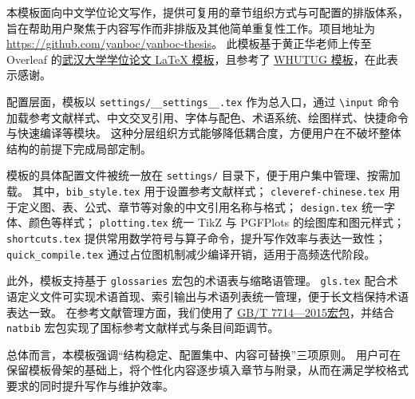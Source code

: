 
%

\begin{cnabstract}

本模板面向中文学位论文写作，提供可复用的章节组织方式与可配置的排版体系，旨在帮助用户聚焦于内容写作而非排版及其他简单重复性工作。项目地址为 \url{https://github.com/yanboc/yanboc-thesis}。
此模板基于黄正华老师上传至 Overleaf 的\href{https://www.overleaf.com/latex/templates/wu-yi-da-xue-bo-shi-lun-wen-latex-mo-ban/rcdzgvqgkddk}{武汉大学学位论文 LaTeX 模板}，且参考了 \href{https://github.com/whutug/whu-thesis}{WHUTUG 模板}，在此表示感谢。

配置层面，模板以 \texttt{settings/\_\_settings\_\_.tex}
作为总入口，通过 \texttt{\textbackslash input} 命令加载参考文献样式、中文交叉引用、字体与配色、术语系统、绘图样式、快捷命令与快速编译等模块。
这种分层组织方式能够降低耦合度，方便用户在不破坏整体结构的前提下完成局部定制。

模板的具体配置文件被统一放在 \texttt{settings/} 目录下，便于用户集中管理、按需加载。
其中，\texttt{bib\_style.tex}
用于设置参考文献样式；
\texttt{cleveref-chinese.tex} 用于定义图、表、公式、章节等对象的中文引用名称与格式；
\texttt{design.tex} 统一字体、颜色等样式；
\texttt{plotting.tex} 统一 TikZ 与 PGFPlots 的绘图库和图元样式；
\texttt{shortcuts.tex} 提供常用数学符号与算子命令，提升写作效率与表达一致性；
\texttt{quick\_compile.tex} 通过占位图机制减少编译开销，适用于高频迭代阶段。

此外，模板支持基于 \texttt{glossaries} 宏包的术语表与缩略语管理。
\texttt{gls.tex} 配合术语定义文件可实现术语首现、索引输出与术语列表统一管理，便于长文档保持术语表达一致。
在参考文献管理方面，我们使用了 \href{https://github.com/zepinglee/gbt7714-bibtex-style}{GB/T 7714—2015宏包}，并结合 \texttt{natbib} 宏包实现了国标参考文献样式与条目间距调节。

总体而言，本模板强调“结构稳定、配置集中、内容可替换”三项原则。
用户可在保留模板骨架的基础上，将个性化内容逐步填入章节与附录，从而在满足学校格式要求的同时提升写作与维护效率。

\end{cnabstract}
\vspace{1em}\par\vfill

